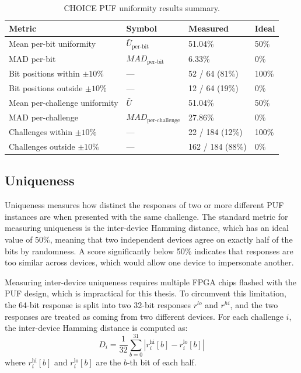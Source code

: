 \begin{table}[ht!]
\centering
\caption{CHOICE PUF uniformity results summary.}
\begin{tabular}{llll}
\hline
\textbf{Metric} & \textbf{Symbol} & \textbf{Measured} & \textbf{Ideal} \\
\hline
Mean per-bit uniformity            & $\bar{U}_\text{per-bit}$      & 51.04\%          & 50\%  \\
MAD per-bit                               & $MAD_\text{per-bit}$   & 6.33\%         & 0\% \\
Bit positions within $\pm10\%$\   & —                             & 52 / 64 (81\%)   & 100\% \\
Bit positions outside $\pm10\%$  & —                             & 12 / 64 (19\%)   & 0\%   \\
\hline
Mean per-challenge uniformity      & $\bar{U}$                           & 51.04\%          & 50\%  \\
MAD per-challenge                              & $MAD_\text{per-challenge}$   & 27.86\%        & 0\% \\
Challenges within $\pm10\%$      & —                                   & 22 / 184 (12\%)  & 100\% \\
Challenges outside $\pm10\%$     & —                                   & 162 / 184 (88\%) & 0\%   \\
\hline
\end{tabular}
\label{tab:uniformity-results}
\end{table}

\subsection{Uniqueness}

Uniqueness measures how distinct the responses of two or more different PUF instances are when presented with the same challenge. The standard metric for measuring uniqueness is the inter-device Hamming distance, which has an ideal value of 50\%, meaning that two independent devices agree on exactly half of the bits by randomness. A score significantly below 50\% indicates that responses are too similar across devices, which would allow one device to impersonate another.

Measuring inter-device uniqueness requires multiple FPGA chips flashed with the PUF design, which is impractical for this thesis. To circumvent this limitation, the 64-bit response is split into two 32-bit responses $r^{lo}$ and $r^{hi}$, and the two responses are treated as coming from two different devices. For each challenge $i$, the inter-device Hamming distance is computed as:
$$
D_i = \frac{1}{32}\sum_{b=0}^{31} \left| r_i^\text{hi}[b] - r_i^\text{lo}[b] \right|
$$
where $r_i^\text{hi}[b]$ and $r_i^\text{lo}[b]$ are the $b$-th bit of each half.

